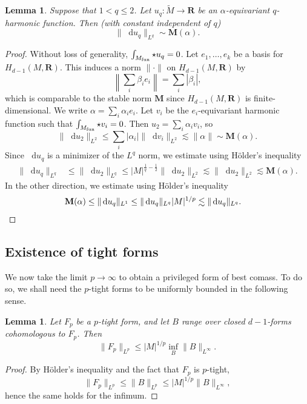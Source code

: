 \documentclass[reqno,11pt]{amsart}
\newcommand{\RR}{\mathbf{R}}
\newcommand*\dif{\mathop{}\!\mathrm{d}}
\newcommand{\Mass}{\mathbf M}
\newtheorem{lemma}[theorem]{Lemma}
\theoremstyle{definition}
\numberwithin{equation}{section}
\begin{document}
\begin{lemma}
Suppose that $1 < q \leq 2$.
Let $u_q: \tilde M \to \RR$ be an $\alpha$-equivariant $q$-harmonic function.
Then (with constant independent of $q$)
\begin{equation}\label{q Laplacian Sobolev regularity estimate}
\|\dif u_q\|_{L^q} \sim \Mass(\alpha).
\end{equation}
\end{lemma}
\begin{proof}
Without loss of generality, $\int_{M_{\rm fun}} \star u_q = 0$.
Let $e_1, \dots, e_k$ be a basis for $H_{d - 1}(M, \RR)$.
This induces a norm $\|\cdot\|$ on $H_{d - 1}(M, \RR)$ by
$$\left\|\sum_i \beta_i e_i\right\| = \sum_i |\beta_i|,$$
which is comparable to the stable norm $\Mass$ since $H_{d - 1}(M, \RR)$ is finite-dimensional.
We write $\alpha = \sum_i \alpha_i e_i$.
Let $v_i$ be the $e_i$-equivariant harmonic function such that $\int_{M_{\rm fun}} \star v_i = 0$.
Then $u_2 = \sum_i \alpha_i v_i$, so
$$\|\dif u_2\|_{L^2} \leq \sum_i |\alpha_i| \|\dif v_i\|_{L^2} \lesssim \|\alpha\| \sim \Mass(\alpha).$$
Since $\dif u_q$ is a minimizer of the $L^q$ norm, we estimate using H\"older's inequality 
\begin{align*}
\|\dif u_q\|_{L^q} &\leq \|\dif u_2\|_{L^q} \leq |M|^{\frac{1}{q} - \frac{1}{2}} \|\dif u_2\|_{L^2} \lesssim \|\dif u_2\|_{L^2} \lesssim \Mass(\alpha).
\end{align*}
In the other direction, we estimate using H\"older's inequality
\begin{align*}
\Mass(\alpha) &\leq \|\dif u_q\|_{L^1} \leq \|\dif u_q\|_{L^q} |M|^{1/p} \lesssim \|\dif u_q\|_{L^q}. \qedhere 
\end{align*}
\end{proof}


\subsection{\texorpdfstring{Existence of tight forms}{Existence of tight forms}}
We now take the limit $p \to \infty$ to obtain a privileged form of best comass.
To do so, we shall need the $p$-tight forms to be uniformly bounded in the following sense.

\begin{lemma}
Let $F_p$ be a $p$-tight form, and let $B$ range over closed $d - 1$-forms cohomologous to $F_p$. Then
\begin{equation}\label{infinity magnetic rules p magnetic}
	\|F_p\|_{L^p} \leq |M|^{1/p} \inf_B \|B\|_{L^\infty}.
\end{equation}
\end{lemma}
\begin{proof}
By H\"older's inequality and the fact that $F_p$ is $p$-tight,
$$\|F_p\|_{L^p} \leq \|B\|_{L^p} \leq |M|^{1/p} \|B\|_{L^\infty},$$
hence the same holds for the infimum.
\end{proof}
\end{document}
